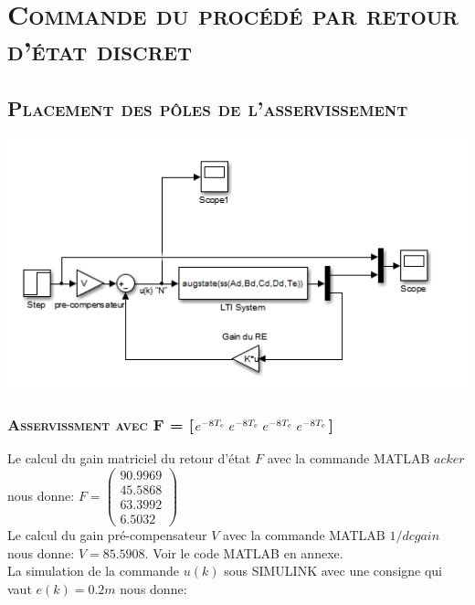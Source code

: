 \chapter{\textsc{Commande du procédé par retour d'état discret}}
\section{\textsc{ Placement des pôles de l'asservissement }}

	\begin{center}
	\includegraphics[scale=0.6]{simu1.png}
	\label{fig3} 
	\end{center}

\subsection{\textsc{ Asservissment avec F = [$e^{-8T_e} \hspace{1 mm}e^{-8T_e} \hspace{1 mm}e^{-8T_e} \hspace{1 mm}e^{-8T_e}$] }}

Le calcul du gain matriciel du retour d'état $F$ avec la commande MATLAB $acker$ nous donne:
$F = \begin{pmatrix}
	90.9969 \\
	45.5868 \\
	63.3992 \\
	6.5032
\end{pmatrix}$\\

Le calcul du gain pré-compensateur $V$ avec la commande MATLAB $1/dcgain$ nous donne: \hspace{1 cm} $V= 85.5908$. Voir le code MATLAB en annexe.\\
La simulation de la commande $u(k)$ sous SIMULINK avec une consigne qui vaut $e(k)=0.2 m$ nous donne:\\

